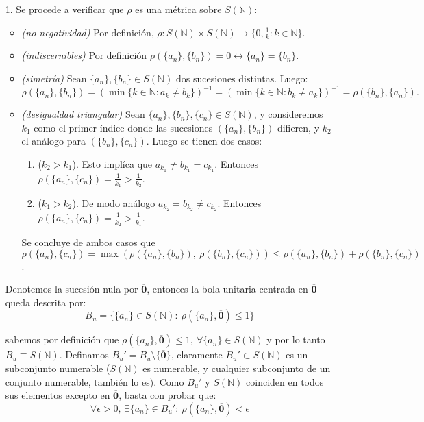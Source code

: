 \documentclass[spanish, fleqn]{article}
\begin{document}
\begin{itemize}
    \item[1.] Se procede a verificar que $\rho$ es una métrica sobre $S(\mathbb{N})$:

    \begin{itemize}
        \item \textit{(no negatividad)} Por definición, $\rho: S(\mathbb{N})\times S(\mathbb{N}) \rightarrow \{0, \frac{1}{k}: k\in \mathbb{N}\}$.
        \item \textit{(indiscernibles)} Por definición $\rho(\{a_n\}, \{b_n\})=0 \leftrightarrow \{a_n\}=\{b_n\}$.
        \item \textit{(simetría)} Sean $\{a_n\},\{b_n\} \in S(\mathbb{N})$ dos sucesiones distintas. Luego:
        \begin{equation*}
            \rho(\{a_n\}, \{b_n\}) = (\min\{k \in \mathbb{N}: a_k \neq b_k\})^{-1} = (\min\{k \in \mathbb{N}: b_k \neq a_k\})^{-1} = \rho(\{b_n\}, \{a_n\}).
        \end{equation*}
        \item \textit{(desigualdad triangular)} Sean $\{a_n\},\{b_n\}, \{c_n\} \in S(\mathbb{N})$, y consideremos $k_1$  como el primer índice donde las sucesiones $(\{a_n\},\{b_n\})$ difieren, y $k_2$ el análogo para $(\{b_n\}, \{c_n\})$. Luego
        se tienen dos casos:
        \begin{enumerate}
            \item ($k_2 > k_1$). Esto implíca que $a_{k_1} \neq b_{k_1} = c_{k_1}$. Entonces $\rho(\{a_n\},\{c_n\})=\frac{1}{k_1} > \frac{1}{k_2}$.
            \item ($k_1 > k_2$). De modo análogo $a_{k_2} = b_{k_2} \neq c_{k_2}$. Entonces $\rho(\{a_n\},\{c_n\})=\frac{1}{k_2} > \frac{1}{k_1}$.
        \end{enumerate}
        Se concluye de ambos casos que $\rho(\{a_n\},\{c_n\}) = \max(\rho(\{a_n\},\{b_n\}),\ \rho(\{b_n\},\{c_n\})) \leq \rho(\{a_n\},\{b_n\}) +  \rho(\{b_n\},\{c_n\})$.
    \end{itemize}

    Denotemos la sucesión nula por $\overline{\mathbf{0}}$, entonces la bola unitaria centrada en $\overline{\mathbf{0}}$  queda
    descrita por:
    \begin{equation}
        B_u = \{ \{a_n\} \in S(\mathbb{N}):\ \rho(\{a_n\}, \overline{\mathbf{0}}) \leq 1 \}
    \end{equation}

    sabemos por definición que $\rho(\{a_n\}, \overline{\mathbf{0}}) \leq 1, \ \forall \{a_n\} \in S(\mathbb{N})$ y por lo tanto $B_u \equiv S(\mathbb{N})$. Definamos $B_u' = B_u \setminus \{\overline{\mathbf{0}}\}$, claramente $B_u' \subset S(\mathbb{N})$ es un subconjunto numerable ($S(\mathbb{N})$ es numerable, y cualquier subconjunto de un conjunto numerable, también lo es). Como $B_u'$ y $S(\mathbb{N})$ coinciden en todos sus elementos excepto en $\overline{\mathbf{0}}$, basta con probar que:
    \begin{equation}
        \forall \epsilon >0, \ \exists \{a_n\}\in B_u': \ \rho(\{a_n\}, \overline{\mathbf{0}}) < \epsilon
    \label{eq:req}
    \end{equation}


\end{itemize}
\end{document}
